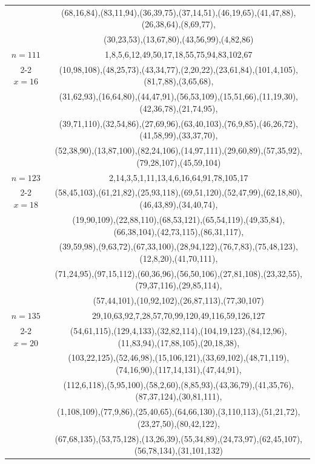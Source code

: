 \begin{tabular}{| c | c |}
&(68,16,84),(83,11,94),(36,39,75),(37,14,51),(46,19,65),(41,47,88),(26,38,64),(8,69,77),\\
&(30,23,53),(13,67,80),(43,56,99),(4,82,86)\\
\hline 
\(n=111\) & 
1,8,5,6,12,49,50,17,18,55,75,94,83,102,67\\
\cline{2-2}
\(x=16\)
&(10,98,108),(48,25,73),(43,34,77),(2,20,22),(23,61,84),(101,4,105),(81,7,88),(3,65,68),\\
&(31,62,93),(16,64,80),(44,47,91),(56,53,109),(15,51,66),(11,19,30),(42,36,78),(21,74,95),\\
&(39,71,110),(32,54,86),(27,69,96),(63,40,103),(76,9,85),(46,26,72),(41,58,99),(33,37,70),\\
&(52,38,90),(13,87,100),(82,24,106),(14,97,111),(29,60,89),(57,35,92),(79,28,107),(45,59,104)\\
\hline 
\(n=123\) & 
2,14,3,5,1,11,13,4,6,16,64,91,78,105,17\\
\cline{2-2}
\(x=18\)
&(58,45,103),(61,21,82),(25,93,118),(69,51,120),(52,47,99),(62,18,80),(46,43,89),(34,40,74),\\
&(19,90,109),(22,88,110),(68,53,121),(65,54,119),(49,35,84),(66,38,104),(42,73,115),(86,31,117),\\
&(39,59,98),(9,63,72),(67,33,100),(28,94,122),(76,7,83),(75,48,123),(12,8,20),(41,70,111),\\
&(71,24,95),(97,15,112),(60,36,96),(56,50,106),(27,81,108),(23,32,55),(79,37,116),(29,85,114),\\
&(57,44,101),(10,92,102),(26,87,113),(77,30,107)\\
\hline 
\(n=135\) & 
29,10,63,92,7,28,57,70,99,120,49,116,59,126,127\\
\cline{2-2}
\(x=20\)
&(54,61,115),(129,4,133),(32,82,114),(104,19,123),(84,12,96),(11,83,94),(17,88,105),(20,18,38),\\
&(103,22,125),(52,46,98),(15,106,121),(33,69,102),(48,71,119),(74,16,90),(117,14,131),(47,44,91),\\
&(112,6,118),(5,95,100),(58,2,60),(8,85,93),(43,36,79),(41,35,76),(87,37,124),(30,81,111),\\
&(1,108,109),(77,9,86),(25,40,65),(64,66,130),(3,110,113),(51,21,72),(23,27,50),(80,42,122),\\
&(67,68,135),(53,75,128),(13,26,39),(55,34,89),(24,73,97),(62,45,107),(56,78,134),(31,101,132)\\
\hline 
\end{tabular}